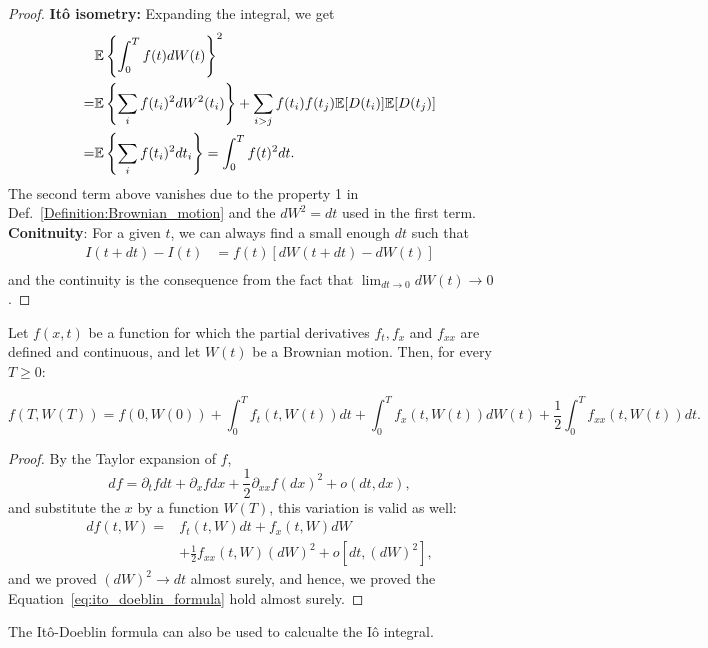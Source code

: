 \begin{proof}
\textbf{It\^{o} isometry:} Expanding the integral, we get
\begin{equation*}
\begin{aligned}
&\mathbb{E}\left\{\int_0^Tf(t)dW(t)\right\}^2\\
=&\mathbb{E}\left\{\sum_if(t_i)^2dW^2(t_i)\right\}+\sum_{i>j}f(t_i)f(t_j)\mathbb{E}[D(t_i)]\mathbb{E}[D(t_j)]\\
=&\mathbb{E}\left\{\sum_if(t_i)^2dt_i\right\}=\int_0^Tf(t)^2dt.
\end{aligned}
\end{equation*} 
The second term above vanishes due to the property 1 in Def.~\ref{Definition:Brownian_motion} and the $dW^2=dt$ used in the first term.
\textbf{Conitnuity}: For a given $t$, we can always find a small enough $dt$ such that
\begin{equation*}
\begin{aligned}
I(t+dt)-I(t)&=f(t)[dW(t+dt)-dW(t)]\\
\end{aligned}
\end{equation*}
and the continuity is the consequence from the fact that $\lim_{dt\to0}dW(t)\to 0$. 
\end{proof}

\begin{theorem}
Let $f(x,t)$ be a function for which the partial derivatives $f_t,f_x$ and $f_{xx}$ are defined and continuous, and let $W(t)$ be a Brownian motion. Then, for every $T\ge0$:
\begin{widetext}
\begin{equation}\label{eq:ito_doeblin_formula}
f(T,W(T))=f(0,W(0))+\int_0^T f_t(t,W(t))dt+\int_0^Tf_x(t,W(t))dW(t)+\frac{1}{2}\int_0^Tf_{xx}(t,W(t))dt.
\end{equation}
\end{widetext}
\end{theorem}

\begin{proof}
By the Taylor expansion of $f$,
\begin{equation}
df=\partial_t f dt+\partial_xfdx+\frac{1}{2}\partial_{xx}f(dx)^2+o(dt,dx),
\end{equation}
and substitute the $x$ by a function $W(T)$, this variation is valid as well:
\begin{equation}
\begin{aligned}
df(t,W)=&f_t(t,W)dt+f_x(t,W)dW\\
&+\frac{1}{2}f_{xx}(t,W)(dW)^2+o[dt,(dW)^2],
\end{aligned}
\end{equation}
and we proved $(dW)^2\to dt$ almost surely, and hence, we proved the Equation~\ref{eq:ito_doeblin_formula} hold almost surely.
\end{proof}

The It\^{o}-Doeblin formula can also be used to calcualte the I\^{o} integral.